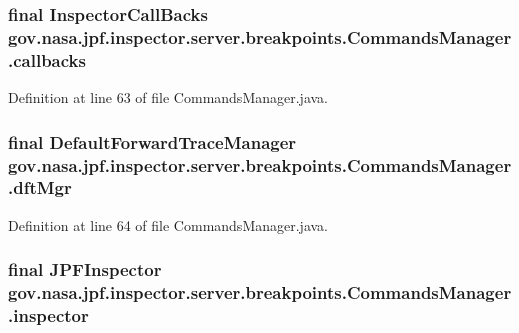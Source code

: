 \subsubsection[{\texorpdfstring{callbacks}{callbacks}}]{\setlength{\rightskip}{0pt plus 5cm}final {\bf Inspector\+Call\+Backs} gov.\+nasa.\+jpf.\+inspector.\+server.\+breakpoints.\+Commands\+Manager.\+callbacks\hspace{0.3cm}{\ttfamily [private]}}\hypertarget{classgov_1_1nasa_1_1jpf_1_1inspector_1_1server_1_1breakpoints_1_1_commands_manager_ab02c6f715b4d31eba248982ab95c61f3}{}\label{classgov_1_1nasa_1_1jpf_1_1inspector_1_1server_1_1breakpoints_1_1_commands_manager_ab02c6f715b4d31eba248982ab95c61f3}


Definition at line 63 of file Commands\+Manager.\+java.

\subsubsection[{\texorpdfstring{dft\+Mgr}{dftMgr}}]{\setlength{\rightskip}{0pt plus 5cm}final {\bf Default\+Forward\+Trace\+Manager} gov.\+nasa.\+jpf.\+inspector.\+server.\+breakpoints.\+Commands\+Manager.\+dft\+Mgr\hspace{0.3cm}{\ttfamily [private]}}\hypertarget{classgov_1_1nasa_1_1jpf_1_1inspector_1_1server_1_1breakpoints_1_1_commands_manager_a74b9803b08950f6fec6f004f5fe10308}{}\label{classgov_1_1nasa_1_1jpf_1_1inspector_1_1server_1_1breakpoints_1_1_commands_manager_a74b9803b08950f6fec6f004f5fe10308}


Definition at line 64 of file Commands\+Manager.\+java.

\subsubsection[{\texorpdfstring{inspector}{inspector}}]{\setlength{\rightskip}{0pt plus 5cm}final {\bf J\+P\+F\+Inspector} gov.\+nasa.\+jpf.\+inspector.\+server.\+breakpoints.\+Commands\+Manager.\+inspector\hspace{0.3cm}{\ttfamily [private]}}\hypertarget{classgov_1_1nasa_1_1jpf_1_1inspector_1_1server_1_1breakpoints_1_1_commands_manager_a281675efc13e0f7e311b76bc7590a6ec}{}\label{classgov_1_1nasa_1_1jpf_1_1inspector_1_1server_1_1breakpoints_1_1_commands_manager_a281675efc13e0f7e311b76bc7590a6ec}



